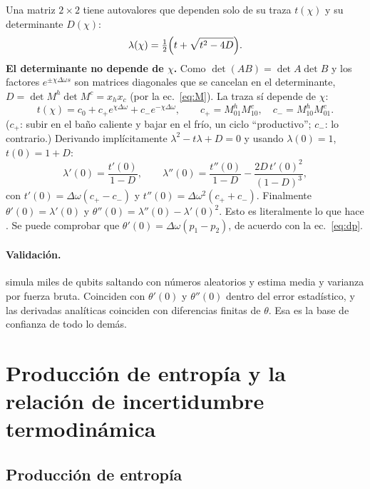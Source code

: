 Una matriz $2\times2$ tiene autovalores que dependen solo de su traza $t(\chi)$ y su determinante
$D(\chi)$:
\begin{equation}
\lambda(\chi) = \tfrac12\Bigl(t + \sqrt{t^2 - 4D}\Bigr).
\end{equation}
\textbf{El determinante no depende de $\chi$.} Como $\det(AB) = \det A\det B$ y los factores
$e^{\pm\chi\Delta\omega s}$ son matrices diagonales que se cancelan en el determinante,
$D = \det M^h\det M^c = x_h x_c$ (por la ec.~\eqref{eq:M}). La traza sí depende de $\chi$:
\begin{equation}
t(\chi) = c_0 + c_+e^{\chi\Delta\omega} + c_-e^{-\chi\Delta\omega},\qquad
c_+ = M^h_{01}M^c_{10},\quad c_- = M^h_{10}M^c_{01}.
\end{equation}
($c_+$: subir en el baño caliente y bajar en el frío, un ciclo ``productivo''; $c_-$: lo contrario.)
Derivando implícitamente $\lambda^2 - t\lambda + D = 0$ y usando $\lambda(0) = 1$, $t(0) = 1 + D$:
\begin{equation}
\lambda'(0) = \frac{t'(0)}{1-D},\qquad
\lambda''(0) = \frac{t''(0)}{1-D} - \frac{2D\,t'(0)^2}{(1-D)^3},
\end{equation}
con $t'(0) = \Delta\omega(c_+ - c_-)$ y $t''(0) = \Delta\omega^2(c_+ + c_-)$. Finalmente
$\theta'(0) = \lambda'(0)$ y $\theta''(0) = \lambda''(0) - \lambda'(0)^2$. Esto es literalmente lo
que hace . Se puede comprobar que $\theta'(0) = \Delta\omega(p_1 - p_2)$,
de acuerdo con la ec.~\eqref{eq:dp}.

\paragraph{Validación.}  simula miles de qubits saltando con números
aleatorios y estima media y varianza por fuerza bruta. Coinciden con $\theta'(0)$ y $\theta''(0)$
dentro del error estadístico, y las derivadas analíticas coinciden con diferencias finitas de
$\theta$. Esa es la base de confianza de todo lo demás.

\section{Producción de entropía y la relación de incertidumbre termodinámica}

\subsection{Producción de entropía}

